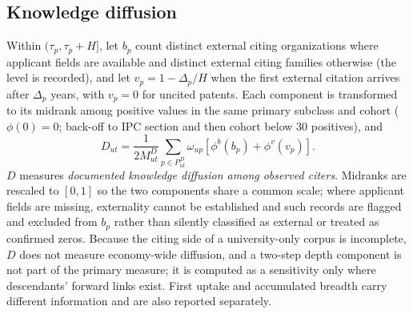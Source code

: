 \subsection{Knowledge diffusion}
Within $(\tau_p,\tau_p+H]$, let $b_p$ count distinct external citing
organizations where applicant fields are available and distinct external
citing families otherwise (the level is recorded), and let
$v_p=1-\Delta_p/H$ when the first external citation arrives after $\Delta_p$
years, with $v_p=0$ for uncited patents. Each component is transformed to its
midrank among positive values in the same primary subclass and cohort
($\phi(0)=0$; back-off to IPC section and then cohort below 30 positives), and
\begin{equation}
D_{ut}=\frac{1}{2M^D_{ut}}\sum_{p\in P^D_{ut}}\omega_{up}
\left[\phi^b(b_p)+\phi^v(v_p)\right].
\label{eq:diffusion}
\end{equation}
$D$ measures \emph{documented knowledge diffusion among observed citers}.
Midranks are rescaled to $[0,1]$ so the two components share a common scale;
where applicant fields are missing, externality cannot be established and such
records are flagged and excluded from $b_p$ rather than silently classified as
external or treated as confirmed zeros. Because the citing side of a
university-only corpus is incomplete, $D$ does not
measure economy-wide diffusion, and a two-step depth component is not part of
the primary measure; it is computed as a sensitivity only where descendants'
forward links exist. First uptake and accumulated breadth carry different
information \citep{huang2019} and are also reported separately.

